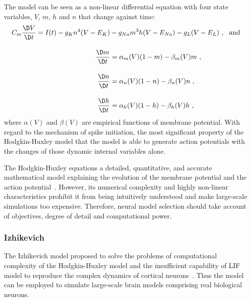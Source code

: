 The \DIFdelbegin {}\DIFdelend \DIFaddbegin {}\DIFaddend model can be seen as a non-linear differential equation with four state variables, $V$, $m$, $h$ and $n$ that change against time:
\begin{equation}
\begin{aligned}
C_m \dfrac{\D V}{\D t} = I(t) - g_{K}n^4(V-E_{K}) &- g_{Na}m^3h(V-E_{Na}) - g_L(V-E_L)~, \textrm{~~and }\\[10pt]
\dfrac{\D m}{\D t} &= \alpha_m(V)(1-m) - \beta_m(V)m~, \\[10pt]
\dfrac{\D n}{\D t} &= \alpha_n(V)(1-n) - \beta_n(V)n~, \\[10pt]
\dfrac{\D h}{\D t} &= \alpha_h(V)(1-h) - \beta_h(V)h~,
\end{aligned}
\end{equation} 
where $\alpha(V)$ and  $\beta(V)$ are empirical functions of membrane potential.
With regard to the mechanism of spike initiation, \DIFdelbegin {}\DIFdelend the most significant property of the Hodgkin-Huxley model \DIFaddbegin {}\DIFaddend that the model is able to generate action potentials with the changes of those dynamic internal variables alone.

The Hodgkin-Huxley equations \DIFdelbegin {}\DIFdelend \DIFaddbegin {}\DIFaddend a detailed, quantitative, and \DIFdelbegin {}\DIFdelend \DIFaddbegin {}\DIFaddend accurate mathematical model explaining the evolution of the membrane potential and the action potential~\citep{byrne2014molecules}.
However, its numerical complexity and highly non-linear characteristics prohibit it from being intuitively understood and make large-scale simulations too expensive.
Therefore, neural model selection should take account of objectives, degree of detail and computational power.

\subsubsection{Izhikevich \DIFaddbegin {}\DIFaddend }
The Izhikevich model \DIFdelbegin {}\DIFdelend \DIFaddbegin {}\DIFaddend proposed to solve the problems of computational complexity of the Hodgkin-Huxley model and the insufficient capability of LIF model to reproduce the complex dynamics of cortical neurons~\citep{izhikevich2003simple}.
Thus the model can be employed to simulate large-scale brain models comprising \DIFdelbegin {}\DIFdelend real biological neurons.


